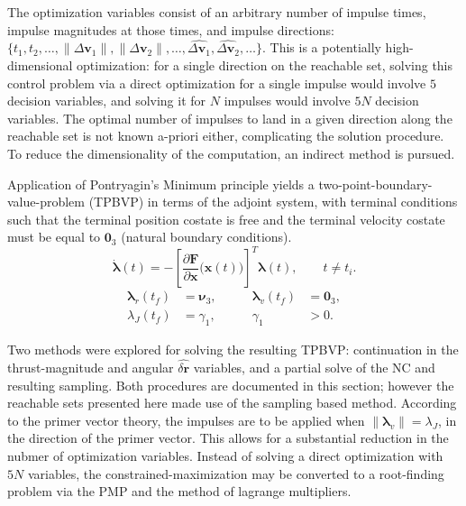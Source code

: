 \documentclass[letterpaper, 10 pt, conference]{ieeeconf}  %
\begin{document}
The optimization variables consist of an arbitrary number of impulse times, impulse magnitudes at those times, and impulse directions: $\{t_1, t_2, \dots, \| \Delta \boldsymbol{v}_1 \|, \| \Delta \boldsymbol{v}_2 \|, \dots, \hat{\Delta \boldsymbol{v}_1}, \hat{\Delta \boldsymbol{v}_2}, \dots \}$. This is a potentially high-dimensional optimization: for a single direction on the reachable set, solving this control problem via a direct optimization for a single impulse would involve $5$ decision variables, and solving it for $N$ impulses would involve $5 N$ decision variables. The optimal number of impulses to land in a given direction along the reachable set is not known a-priori either, complicating the solution procedure. To reduce the dimensionality of the computation, an indirect method is pursued. 


Application of Pontryagin's Minimum principle yields a two-point-boundary-value-problem (TPBVP) in terms of the adjoint system, with terminal conditions such that the terminal position costate is free and the terminal velocity costate must be equal to $\mathbf{0}_3$ (natural boundary conditions). 
\begin{equation}
\dot{\boldsymbol{\lambda}}(t)
=
-
\left[
\frac{\partial \mathbf{F}}
     {\partial \mathbf{x}}
\bigl(\mathbf{x}(t)\bigr)
\right]^T
\boldsymbol{\lambda}(t),
\qquad t\neq t_i.
\end{equation}
\[
\begin{aligned}
\boldsymbol{\lambda}_r(t_f)&=\boldsymbol{\nu}_3,
&\qquad \boldsymbol{\lambda}_v(t_f)&=\mathbf{0}_3,\\
\lambda_J(t_f)&=\gamma_1,
&\qquad \gamma_1&>0.
\end{aligned}
\]

Two methods were explored for solving the resulting TPBVP: continuation in the thrust-magnitude and angular $\hat{\delta\boldsymbol{r}}$ variables, and a partial solve of the NC and resulting sampling. 
Both procedures are documented in this section; however the reachable sets presented here made use of the sampling based method. According to the primer vector theory, the impulses are to be applied when $\left\| \boldsymbol{\lambda}_v \right\| = \lambda_J$, in the direction of the primer vector. 
This allows for a substantial reduction in the nubmer of optimization variables. Instead of solving a direct optimization with $5 N$ variables, the constrained-maximization may be converted to a root-finding problem via the PMP and the method of lagrange multipliers. 
\end{document}
